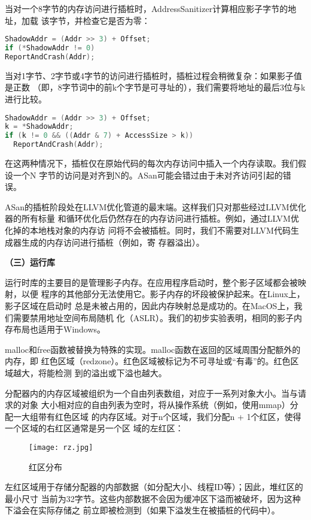 当对一个8字节的内存访问进行插桩时，AddressSanitizer计算相应影子字节的地址，加载
该字节，并检查它是否为零：

\begin{lstlisting}[language=C++]
ShadowAddr = (Addr >> 3) + Offset;
if (*ShadowAddr != 0)
ReportAndCrash(Addr);
\end{lstlisting}

当对1字节、2字节或4字节的访问进行插桩时，插桩过程会稍微复杂：如果影子值是正数
（即，8字节词中的前k个字节是可寻址的），我们需要将地址的最后3位与k进行比较。

\begin{lstlisting}[language=C++]
ShadowAddr = (Addr >> 3) + Offset;
k = *ShadowAddr;
if (k != 0 && ((Addr & 7) + AccessSize > k))
  ReportAndCrash(Addr);
\end{lstlisting}

在这两种情况下，插桩仅在原始代码的每次内存访问中插入一个内存读取。我们假设一个N
字节的访问是对齐到N的。ASan可能会错过由于未对齐访问引起的错误。

ASan的插桩阶段处在LLVM优化管道的最末端。这样我们只对那些经过LLVM优化器的所有标量
和循环优化后仍然存在的内存访问进行插桩。例如，通过LLVM优化掉的本地栈对象的内存访
问将不会被插桩。同时，我们不需要对LLVM代码生成器生成的内存访问进行插桩（例如，寄
存器溢出）。

\textbf{（三）运行库}

运行时库的主要目的是管理影子内存。在应用程序启动时，整个影子区域都会被映射，以便
程序的其他部分无法使用它。影子内存的坏段被保护起来。在Linux上，影子区域在启动时
总是未被占用的，因此内存映射总是成功的。在MacOS上，我们需要禁用地址空间布局随机
化（ASLR）。我们的初步实验表明，相同的影子内存布局也适用于Windows。

malloc和free函数被替换为特殊的实现。malloc函数在返回的区域周围分配额外的内存，即
红色区域（redzone）。红色区域被标记为不可寻址或“有毒”的。红色区域越大，将能检测
到的溢出或下溢也越大。

分配器内的内存区域被组织为一个自由列表数组，对应于一系列对象大小。当与请求的对象
大小相对应的自由列表为空时，将从操作系统（例如，使用mmap）分配一大组带有红色区域
的内存区域。对于n个区域，我们分配n + 1个红区，使得一个区域的右红区通常是另一个区
域的左红区：

\begin{figure}[ht]
	\centering
	\texttt{[image: rz.jpg]}
	\caption{红区分布}
	\label{fig:rz}
\end{figure}

左红区域用于存储分配器的内部数据（如分配大小、线程ID等）；因此，堆红区的最小尺寸
当前为32字节。这些内部数据不会因为缓冲区下溢而被破坏，因为这种下溢会在实际存储之
前立即被检测到（如果下溢发生在被插桩的代码中）。

